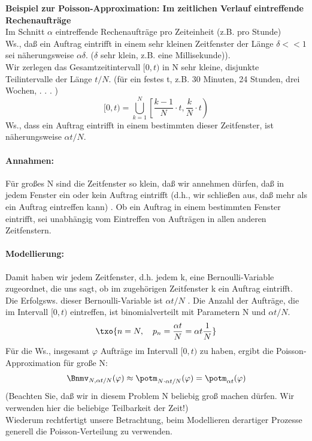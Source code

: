 \begin{bsp}
    \textbf{Beispiel zur Poisson-Approximation: Im zeitlichen Verlauf eintreffende Rechenaufträge}  \\
    Im Schnitt $\alpha$ eintreffende Rechenaufträge pro
    Zeiteinheit (z.B. pro Stunde) \\
    Ws., daß ein Auftrag eintrifft in einem sehr kleinen
    Zeitfenster der Länge $\delta << 1$ sei näherungsweise $\alpha \delta$.
    ($\delta$ sehr klein, z.B. eine Millisekunde)). \\
    Wir zerlegen das Gesamtzeitintervall $[0, t)$ in N sehr kleine, disjunkte
    Teilintervalle der Länge $t/N$. (für ein festes t, z.B. 30 Minuten, 24 Stunden, drei Wochen, . . . )
    \[
        [0, t) = \bigcup_{k=1}^N \left[  \frac{k-1}{N} \cdot t, \frac{k}{N} \cdot t \right)
    \]
    Ws., dass ein Auftrag eintrifft in einem bestimmten dieser Zeitfenster, ist
    näherungsweise $\alpha t / N$.
    \paragraph{Annahmen:} Für großes N sind die Zeitfenster so klein, daß wir annehmen dürfen, daß in
    jedem Fenster ein oder kein Auftrag eintrifft (d.h., wir schließen aus, daß mehr als ein Auftrag eintreffen kann)
    . Ob ein Auftrag in einem bestimmten Fenster eintrifft, sei unabhängig vom
    Eintreffen von Aufträgen in allen anderen Zeitfenstern.
    \paragraph{Modellierung:} Damit haben wir jedem Zeitfenster, d.h. jedem k, eine Bernoulli-Variable
    zugeordnet, die uns sagt, ob im zugehörigen Zeitfenster k ein Auftrag
    eintrifft.
    Die Erfolgsws. dieser Bernoulli-Variable ist $\alpha t / N$
    .
    Die Anzahl der Aufträge, die im Intervall $[0, t)$ eintreffen, ist binomialverteilt
    mit Parametern N und $\alpha t / N$.
    \[
        \txo{ n = N, \quad p_n = \frac{\alpha t}{N}  = \alpha t \frac{1}{N}}
    \]
    Für die Ws., insgesamt $\varphi$ Aufträge im Intervall $[0, t)$ zu haben, ergibt die
    Poisson-Approximation für große N:
    \[
        \Bnmv_{N, \alpha t / N}(\varphi) \approx \potm_{N \cdot \alpha t / N}(\varphi) = \potm_{\alpha t}(\varphi)
    \]
    (Beachten Sie, daß wir in diesem Problem N beliebig groß machen dürfen. Wir verwenden
    hier die beliebige Teilbarkeit der Zeit!) \\
    Wiederum rechtfertigt unsere Betrachtung, beim Modellieren derartiger Prozesse
    generell die Poisson-Verteilung zu verwenden.
\end{bsp}

